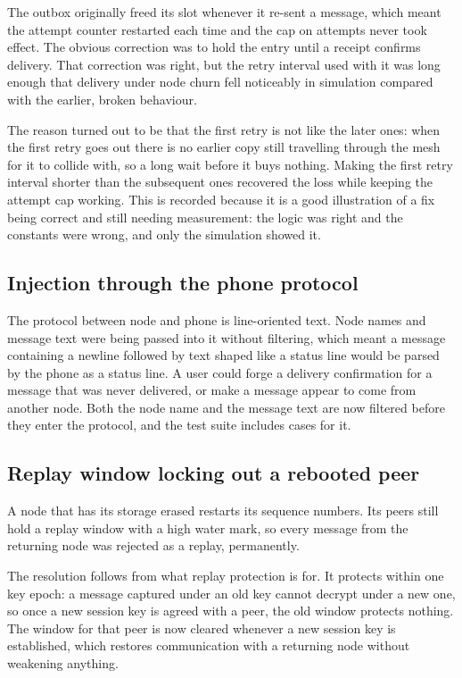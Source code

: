 \documentclass[12pt,a4paper,oneside]{report}
\begin{document}
The outbox originally freed its slot whenever it re-sent a message, which meant
the attempt counter restarted each time and the cap on attempts never took
effect. The obvious correction was to hold the entry until a receipt confirms
delivery. That correction was right, but the retry interval used with it was long
enough that delivery under node churn fell noticeably in simulation compared with
the earlier, broken behaviour.

The reason turned out to be that the first retry is not like the later ones: when
the first retry goes out there is no earlier copy still travelling through the
mesh for it to collide with, so a long wait before it buys nothing. Making the
first retry interval shorter than the subsequent ones recovered the loss while
keeping the attempt cap working. This is recorded because it is a good
illustration of a fix being correct and still needing measurement: the logic was
right and the constants were wrong, and only the simulation showed it.

\subsection{Injection through the phone protocol}

The protocol between node and phone is line-oriented text. Node names and message
text were being passed into it without filtering, which meant a message
containing a newline followed by text shaped like a status line would be parsed
by the phone as a status line. A user could forge a delivery confirmation for a
message that was never delivered, or make a message appear to come from another
node. Both the node name and the message text are now filtered before they enter
the protocol, and the test suite includes cases for it.

\subsection{Replay window locking out a rebooted peer}

A node that has its storage erased restarts its sequence numbers. Its peers still
hold a replay window with a high water mark, so every message from the returning
node was rejected as a replay, permanently.

The resolution follows from what replay protection is for. It protects within one
key epoch: a message captured under an old key cannot decrypt under a new one, so
once a new session key is agreed with a peer, the old window protects nothing.
The window for that peer is now cleared whenever a new session key is
established, which restores communication with a returning node without weakening
anything.
\end{document}
